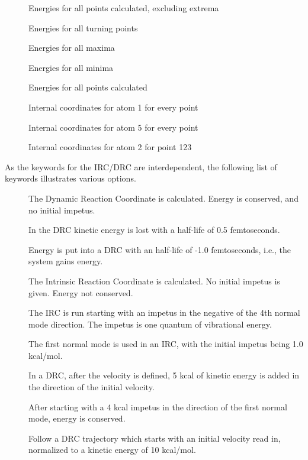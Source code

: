 \begin{description}
\item[\comp{\%}] Energies for all points calculated,    excluding extrema
\item[] Energies for all turning points
\item[] Energies for all maxima
\item[] Energies for all minima
\item[\comp{\%}] Energies for all points calculated
\item[] Internal coordinates for atom 1 for every point
\item[] Internal coordinates for atom 5 for every point
\item[] Internal coordinates for atom 2 for point 123
\end{description}

As the keywords for the IRC/DRC are interdependent,  the  following list of
keywords illustrates various options.

\begin{description}
\item[] The Dynamic Reaction Coordinate is calculated.
Energy is conserved, and no initial impetus.
\item[] In the DRC kinetic energy is lost with a half-life of
0.5 femtoseconds.
\item[] Energy is put into a DRC with an half-life of
-1.0 femtoseconds, i.e., the system gains   energy.
\item[] The Intrinsic Reaction Coordinate is
calculated.  No initial impetus is given.
Energy not conserved.
\item[] The IRC is run starting with an impetus in the
negative of the 4th normal mode direction. The
impetus is one quantum of vibrational energy.
\item[] The first normal mode is used in an IRC, with
the initial impetus being 1.0 kcal/mol.
\item[] In a DRC, after the velocity is defined, 5 kcal
of kinetic energy is added in the direction of
the initial velocity.
\item[] After starting with a 4 kcal impetus in the
direction of the first normal mode, energy is
conserved.
\item[] Follow a DRC trajectory which starts with an
initial velocity read in, normalized to a
kinetic energy of 10 kcal/mol.
\end{description}



